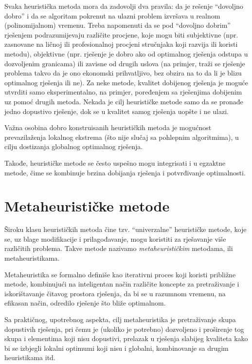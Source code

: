 \documentclass[a4paper, utf8, 11pt, colorlinks]{book}
\theoremstyle{definition}
\begin{document}
 
 Svaka heuristička metoda mora da zadovolji dva pravila: da je rešenje ``dovoljno
 dobro'' i da se algoritam pokrenut na ulazni problem izvršava u realnom (polinomijalnom) vremenu. Treba napomenuti da se pod  ``dovoljno
 dobrim'' rješenjem podrazumijevaju različite procjene, koje mogu biti subjektivne (npr. zasnovane na ličnoj ili profesionalnoj procjeni stručnjaka koji razvija ili koristi metodu), objektivne (npr.  rješenje je dobro ako od optimalnog rješenja odstupa u dozvoljenim granicama) ili zavisne od drugih uslova (na primjer, traži se rješenje problema takvo da je ono ekonomski prihvatljivo, bez obzira na to da li je blizu optimalnog rješenja ili ne). 
 Za neke metode, kvalitet dobijenog rješenja je moguće utvrditi samo eksperimentalno, na primjer, poređenjem sa rješenjima dobijenim uz pomoć drugih metoda. Nekada je cilj heurističke metode samo da se pronađe jedno dopustivo rješenje, dok se u kvalitet samog rješenja uopšte i ne ulazi.
 
 Važna osobina dobro konstruisanih heurističkih metoda je mogućnost prevazilaženja lokalnog ekstrema (što nije slučaj sa pohlepnim algoritmima), u cilju dostizanja globalnog optimalnog rješenja. 
 
 Takođe, heurističke metode se često uspešno mogu integrisati i u egzaktne metode, čime se kombinuje brzina dobijanja rješenja i potvrđivanje optimalnosti.
 
 \section{Metaheurističke metode}
 
 Široku klasu heurističkih metoda čine tzv. ``univerzalne'' heurističke metode, koje se, uz blage modifikacije i prilagođavanje, mogu koristiti za rješavanje više različitih problema. Takve metode nazivamo \emph{metaheurističkim} metodama, ili metaheuristikama.  
 
 Metaheuristika se formalno definiše kao iterativni proces koji koristi približne metode, kombinujući na inteligentan način različite koncepte za pretraživanje i iskorištavanje čitavog prostora rješenja, da bi se u razumnom vremenu, na efikasan način, odredilo rješenje što bliže optimalnom.
 
 Sa praktičnog, upotrebnog aspekta, cilj metaheuristika je pretraživanje skupa dopustivih rješenja, pri čemu je (ukoliko je potrebno) dozvoljeno i proširenje tog skupa i elementima koji nisu dopustivi, prelazak u rješenja slabijeg kvali\-teta kako bi se izbjegli lokalni optimumi koji nisu i globalni, kombinovanje sa drugim heuristikama itd.
 
\end{document}

